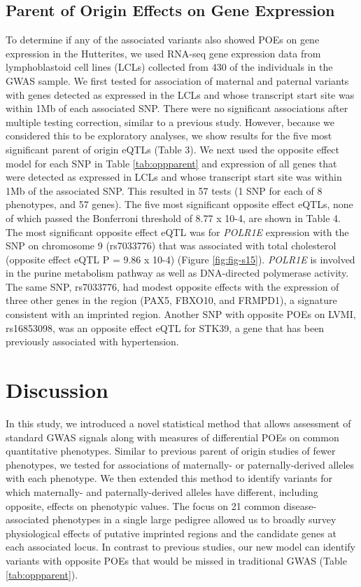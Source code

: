 \subsection{Parent of Origin Effects on Gene Expression}\label{Parent of Origin Effects on Gene Expression}

To determine if any of the associated variants also showed POEs on gene expression in the Hutterites, we used RNA-seq gene expression data from lymphoblastoid cell lines (LCLs) collected from 430 of the individuals in the GWAS sample. We first tested for association of maternal and paternal variants with genes detected as expressed in the LCLs and whose transcript start site was within 1Mb of each associated SNP. There were no significant associations after multiple testing correction, similar to a previous study\cite{Benonisdottir:2016dz}. However, because we considered this to be exploratory analyses, we show results for the five most significant parent of origin eQTLs (Table 3). We next used the opposite effect model for each SNP in Table \ref{tab:oppparent} and expression of all genes that were detected as expressed in LCLs and whose transcript start site was within 1Mb of the associated SNP. This resulted in 57 tests (1 SNP for each of 8 phenotypes, and 57 genes). The five most significant opposite effect eQTLs, none of which passed the Bonferroni threshold of 8.77 x 10-4, are shown in Table 4. The most significant opposite effect eQTL was for \emph{POLR1E} expression with the SNP on chromosome 9 (rs7033776) that was associated with total cholesterol (opposite effect eQTL P = 9.86 x 10-4) (Figure \ref{fig:fig-s15}). \emph{POLR1E} is involved in the purine metabolism pathway as well as DNA-directed polymerase activity. The same SNP, rs7033776, had modest opposite effects with the expression of three other genes in the region (PAX5, FBXO10, and FRMPD1), a signature consistent with an imprinted region. Another SNP with opposite POEs on LVMI, rs16853098, was an opposite effect eQTL for STK39, a gene that has been previously associated with hypertension\cite{Wang:2009bt}.


\section{Discussion}\label{ch02-discussion}

In this study, we introduced a novel statistical method that allows assessment of standard GWAS signals along with measures of differential POEs on common quantitative phenotypes. Similar to previous parent of origin studies of fewer phenotypes\cite{Kong:2009kk,Benonisdottir:2016dz,Garg2012a}, we tested for associations of maternally- or paternally-derived alleles with each phenotype. We then extended this method to identify variants for which maternally- and paternally-derived alleles have different, including opposite, effects on phenotypic values. The focus on 21 common disease-associated phenotypes in a single large pedigree allowed us to broadly survey physiological effects of putative imprinted regions and the candidate genes at each associated locus. In contrast to previous studies, our new model can identify variants with opposite POEs that would be missed in traditional GWAS (Table \ref{tab:oppparent}). 

